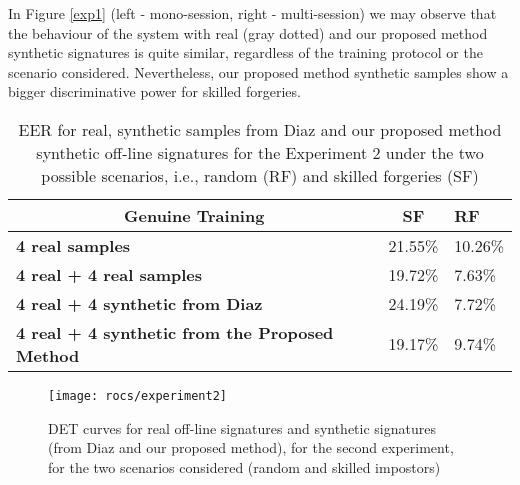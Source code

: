 In Figure \ref{exp1} (left - mono-session, right - multi-session) we
may observe that the behaviour of the system with real (gray dotted) and our proposed method synthetic signatures is quite similar, regardless of
the training protocol or the scenario considered. Nevertheless, our proposed method synthetic samples show a bigger discriminative power for skilled forgeries.

\begin{table}[!htb]
	\renewcommand{\arraystretch}{1.3}
	\caption{EER for real, synthetic samples from Diaz \cite{diaz2014generation} and our proposed method synthetic off-line signatures for the Experiment 2 under the two possible scenarios, i.e., random (RF) and skilled forgeries (SF)}
	\label{exp2_results_table}
	\centering
	\begin{tabular}{|l|l|l|}
		\hline
		\multicolumn{1}{|c|}{\textbf{Genuine Training}} & \multicolumn{1}{c|}{\textbf{SF}} & \textbf{RF} \\ \hline
		\textbf{4 real samples}                                         & 21.55\%                     & 10.26\%                         \\ \hline
		\textbf{4 real + 4 real samples}                       & 19.72\%                      & 7.63\%                        \\ \hline
		\textbf{4 real + 4 synthetic from Diaz}                           & 24.19\%                         & 7.72\%                \\ \hline
		\textbf{4 real + 4 synthetic from the Proposed Method}                           & 19.17\%         & 9.74\%                        \\ \hline
	\end{tabular}

\end{table}
\begin{figure}[!htb]
	\centering
	\label{exp2}
	\texttt{[image: rocs/experiment2]}
	\caption{DET curves for real off-line signatures and synthetic signatures (from Diaz and our proposed method), for the second experiment, for the two scenarios considered (random and skilled impostors)}

\end{figure}
